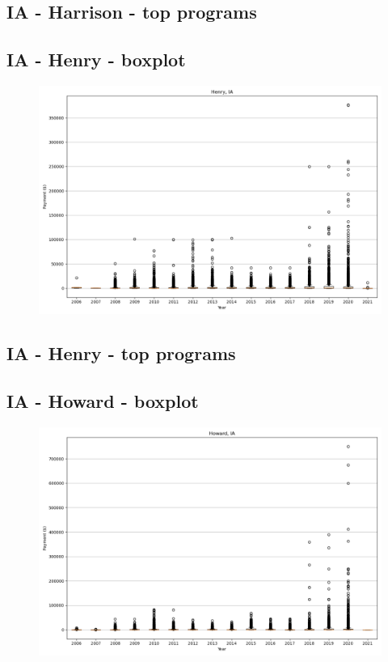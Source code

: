 \subsection*{IA - Harrison - top programs}

\newpage
\subsection*{IA - Henry - boxplot}
\begin{figure}[h]
\centering
\includegraphics[width=7in]{../output/boxplots/counties/Henry-IA_boxplot.png}
\end{figure}


\subsection*{IA - Henry - top programs}

\newpage
\subsection*{IA - Howard - boxplot}
\begin{figure}[h]
\centering
\includegraphics[width=7in]{../output/boxplots/counties/Howard-IA_boxplot.png}
\end{figure}


